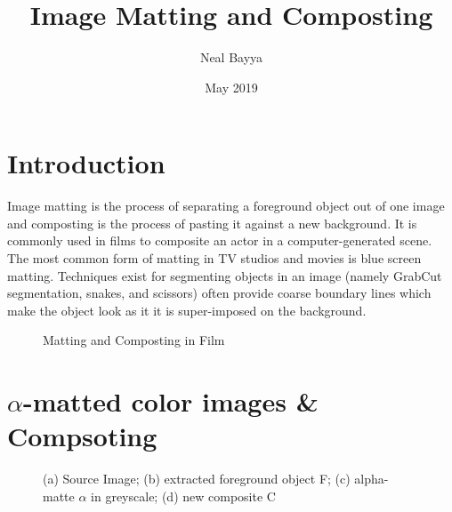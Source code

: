\documentclass{article}
\title{Image Matting and Composting}
\author{Neal Bayya }
\date{May 2019}
\begin{document}
\maketitle

\section{Introduction}
Image matting is the process of separating a foreground object out of one image and composting is the process of pasting it against a new background. It is commonly used in films to composite an actor in a computer-generated scene. The most common form of matting in TV studios and movies is blue screen matting. Techniques exist for segmenting objects in an image (namely GrabCut segmentation, snakes, and scissors) often provide coarse boundary lines which make the object look as it it is super-imposed on the background.  

\begin{figure}[h]
 \centering
 \label{superman}
 \caption{Matting and Composting in Film}
\end{figure}

\section{$\alpha$-matted color images \& Compsoting}

\begin{figure}[h]
 \centering
 \caption{(a) Source Image; (b) extracted foreground object F; (c) alpha-matte $\alpha$ in greyscale; (d) new composite C}
 \label{alphamatting}
\end{figure}
\end{document}
